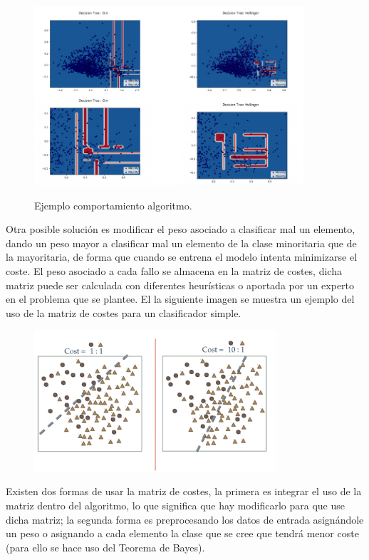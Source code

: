 \begin{figure}[h]
	\centering
	\includegraphics[width=100mm]{imagenes/hellinger-example.png}
	\label{fig:4}
	\caption{Ejemplo comportamiento algoritmo.}
\end{figure}
\verticalspace

Otra posible solución es modificar el peso asociado a clasificar mal un elemento, dando un peso mayor a clasificar mal un elemento de la clase minoritaria que de la mayoritaria, de forma que cuando se entrena el modelo intenta minimizarse el coste. El peso asociado a cada fallo se almacena en la matriz de costes, dicha matriz puede ser calculada con diferentes heurísticas o aportada por un experto en el problema que se plantee. El la siguiente imagen se muestra un ejemplo del uso de la matriz de costes para un clasificador simple.\newline

\begin{figure}[h]
	\centering
	\includegraphics[width=90mm]{imagenes/cost-sentitive.png}
	\label{fig:5}
\end{figure}
\verticalspace

Existen dos formas de usar la matriz de costes, la primera es integrar el uso de la matriz dentro del algoritmo, lo que significa que hay modificarlo para que use dicha matriz; la segunda forma es preprocesando los datos de entrada asignándole un peso o asignando a cada elemento la clase que se cree que tendrá menor coste (para ello se hace uso del Teorema de Bayes).
